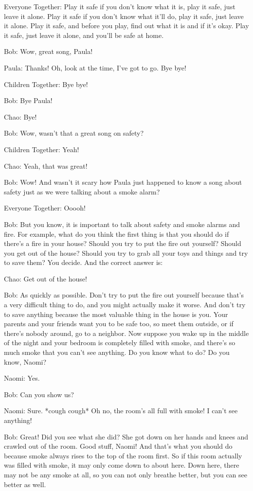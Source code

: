 Everyone Together: Play it safe if you don't know what it is, play it safe, just leave it alone. Play it safe if you don't know what it'll do, play it safe, just leave it alone. Play it safe, and before you play, find out what it is and if it's okay. Play it safe, just leave it alone, and you'll be safe at home.

Bob: Wow, great song, Paula!

Paula: Thanks! Oh, look at the time, I've got to go. Bye bye!

Children Together: Bye bye!

Bob: Bye Paula!

Chao: Bye!

Bob: Wow, wasn't that a great song on safety?

Children Together: Yeah!

Chao: Yeah, that was great!

Bob: Wow! And wasn't it scary how Paula just happened to know a song about safety just as we were talking about a smoke alarm?

Everyone Together: Ooooh!

Bob: But you know, it is important to talk about safety and smoke alarms and fire. For example, what do you think the first thing is that you should do if there's a fire in your house? Should you try to put the fire out yourself? Should you get out of the house? Should you try to grab all your toys and things and try to save them? You decide. And the correct answer is:

Chao: Get out of the house!

Bob: As quickly as possible. Don't try to put the fire out yourself because that's a very difficult thing to do, and you might actually make it worse. And don't try to save anything because the most valuable thing in the house is you. Your parents and your friends want you to be safe too, so meet them outside, or if there's nobody around, go to a neighbor. Now suppose you wake up in the middle of the night and your bedroom is completely filled with smoke, and there's so much smoke that you can't see anything. Do you know what to do? Do you know, Naomi?

Naomi: Yes.

Bob: Can you show us?

Naomi: Sure. *cough cough* Oh no, the room's all full with smoke! I can't see anything!

Bob: Great! Did you see what she did? She got down on her hands and knees and crawled out of the room. Good stuff, Naomi! And that's what you should do because smoke always rises to the top of the room first. So if this room actually was filled with smoke, it may only come down to about here. Down here, there may not be any smoke at all, so you can not only breathe better, but you can see better as well.

